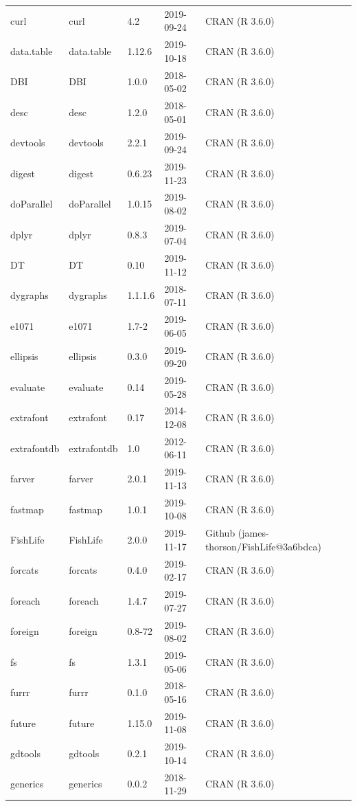 \documentclass[]{article}
\begin{document}
\begin{longtable}[t]{lllll}
\addlinespace
curl & curl & 4.2 & 2019-09-24 & CRAN (R 3.6.0)\\
data.table & data.table & 1.12.6 & 2019-10-18 & CRAN (R 3.6.0)\\
DBI & DBI & 1.0.0 & 2018-05-02 & CRAN (R 3.6.0)\\
desc & desc & 1.2.0 & 2018-05-01 & CRAN (R 3.6.0)\\
devtools & devtools & 2.2.1 & 2019-09-24 & CRAN (R 3.6.0)\\
\addlinespace
digest & digest & 0.6.23 & 2019-11-23 & CRAN (R 3.6.0)\\
doParallel & doParallel & 1.0.15 & 2019-08-02 & CRAN (R 3.6.0)\\
dplyr & dplyr & 0.8.3 & 2019-07-04 & CRAN (R 3.6.0)\\
DT & DT & 0.10 & 2019-11-12 & CRAN (R 3.6.0)\\
dygraphs & dygraphs & 1.1.1.6 & 2018-07-11 & CRAN (R 3.6.0)\\
\addlinespace
e1071 & e1071 & 1.7-2 & 2019-06-05 & CRAN (R 3.6.0)\\
ellipsis & ellipsis & 0.3.0 & 2019-09-20 & CRAN (R 3.6.0)\\
evaluate & evaluate & 0.14 & 2019-05-28 & CRAN (R 3.6.0)\\
extrafont & extrafont & 0.17 & 2014-12-08 & CRAN (R 3.6.0)\\
extrafontdb & extrafontdb & 1.0 & 2012-06-11 & CRAN (R 3.6.0)\\
\addlinespace
farver & farver & 2.0.1 & 2019-11-13 & CRAN (R 3.6.0)\\
fastmap & fastmap & 1.0.1 & 2019-10-08 & CRAN (R 3.6.0)\\
FishLife & FishLife & 2.0.0 & 2019-11-17 & Github (james-thorson/FishLife@3a6bdca)\\
forcats & forcats & 0.4.0 & 2019-02-17 & CRAN (R 3.6.0)\\
foreach & foreach & 1.4.7 & 2019-07-27 & CRAN (R 3.6.0)\\
\addlinespace
foreign & foreign & 0.8-72 & 2019-08-02 & CRAN (R 3.6.0)\\
fs & fs & 1.3.1 & 2019-05-06 & CRAN (R 3.6.0)\\
furrr & furrr & 0.1.0 & 2018-05-16 & CRAN (R 3.6.0)\\
future & future & 1.15.0 & 2019-11-08 & CRAN (R 3.6.0)\\
gdtools & gdtools & 0.2.1 & 2019-10-14 & CRAN (R 3.6.0)\\
\addlinespace
generics & generics & 0.0.2 & 2018-11-29 & CRAN (R 3.6.0)\\

\end{longtable}
\end{document}
